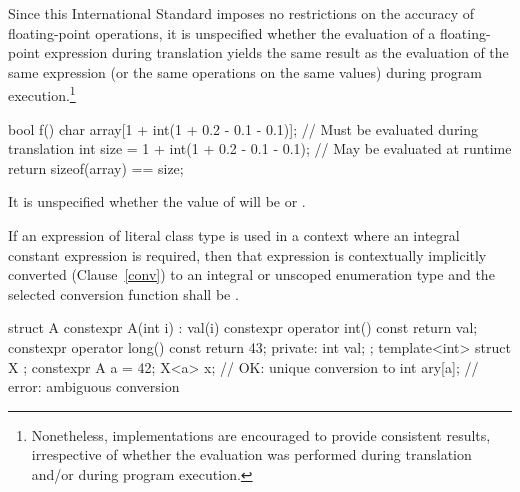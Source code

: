 \pnum
\enternote Since this International Standard
imposes no restrictions on the accuracy of floating-point operations, it is unspecified whether the
evaluation of a floating-point expression during translation yields the same result as the
evaluation of the same expression (or the same operations on the same values) during program
execution.\footnote{Nonetheless, implementations are encouraged to provide consistent results,
irrespective of whether the evaluation was performed during translation and/or during program
execution.} \enterexample

\begin{codeblock}
bool f() {
    char array[1 + int(1 + 0.2 - 0.1 - 0.1)];  // Must be evaluated during translation
    int size = 1 + int(1 + 0.2 - 0.1 - 0.1);   // May be evaluated at runtime
    return sizeof(array) == size;
}
\end{codeblock}
It is unspecified whether the value of  will be  or .
\exitexample \exitnote

\pnum
If an expression of literal class type is used in a context where an 
integral constant expression is required, then that expression is
contextually implicitly converted (Clause~\ref{conv}) to an integral or unscoped
enumeration type 
and the selected conversion function shall be . \enterexample
\begin{codeblock}
struct A { 
  constexpr A(int i) : val(i) { } 
  constexpr operator int() const { return val; }
  constexpr operator long() const { return 43; }
private: 
  int val; 
}; 
template<int> struct X { }; 
constexpr A a = 42; 
X<a> x;             // OK: unique conversion to 
int ary[a];         // error: ambiguous conversion 
\end{codeblock}
\exitexample%
